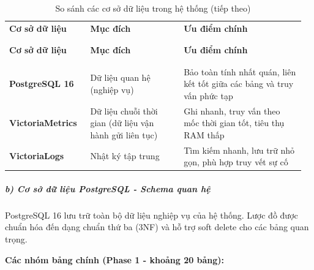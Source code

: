 \documentclass[a4paper]{extarticle}
\newcommand{\thesissettableid}[2]{%
  \renewcommand{\thetable}{#1}%
  \renewcommand{\theHtable}{#2}%
}
\begin{document}
{\thesissettableid{3.18}{tab-ch3-so-sanh-cac-co-so-du-lieu-trong-he-thong}
\def\LTcaptype{table}
\begin{longtable}{|L{0.269\linewidth}|L{0.305\linewidth}|L{0.390\linewidth}|}
\caption{So sánh các cơ sở dữ liệu trong hệ thống}\label{tab:ch3-so-sanh-cac-co-so-du-lieu-trong-he-thong}\\
\hline \textbf{Cơ sở dữ liệu} & \textbf{Mục đích} & \textbf{Ưu điểm chính} \\
\\\hline
\endfirsthead
\caption[]{So sánh các cơ sở dữ liệu trong hệ thống (tiếp theo)}\\
\hline \textbf{Cơ sở dữ liệu} & \textbf{Mục đích} & \textbf{Ưu điểm chính} \\
\\\hline
\endhead
\\\hline
\endfoot
\endlastfoot
\textbf{PostgreSQL 16} & Dữ liệu quan hệ (nghiệp vụ) & Bảo toàn tính nhất quán,
liên kết tốt giữa các bảng và truy vấn phức tạp \\\hline
\textbf{VictoriaMetrics} & Dữ liệu chuỗi thời gian (dữ liệu vận hành gửi liên tục) & Ghi nhanh,
truy vấn theo mốc thời gian tốt, tiêu thụ RAM thấp \\\hline
\textbf{VictoriaLogs} & Nhật ký tập trung & Tìm kiếm nhanh,
lưu trữ nhỏ gọn, phù hợp truy vết sự cố \\\hline
\end{longtable}
}


\subparagraph{b) Cơ sở dữ liệu PostgreSQL - Schema quan
hệ}\label{b-cux1a1-sux1edf-dux1eef-liux1ec7u-postgresql---schema-quan-hux1ec7}

PostgreSQL 16 lưu trữ toàn bộ dữ liệu nghiệp vụ của hệ thống. Lược đồ
được chuẩn hóa đến dạng chuẩn thứ ba (3NF) và hỗ trợ soft delete cho các
bảng quan trọng.

\textbf{Các nhóm bảng chính (Phase 1 - khoảng 20 bảng):}
\end{document}
